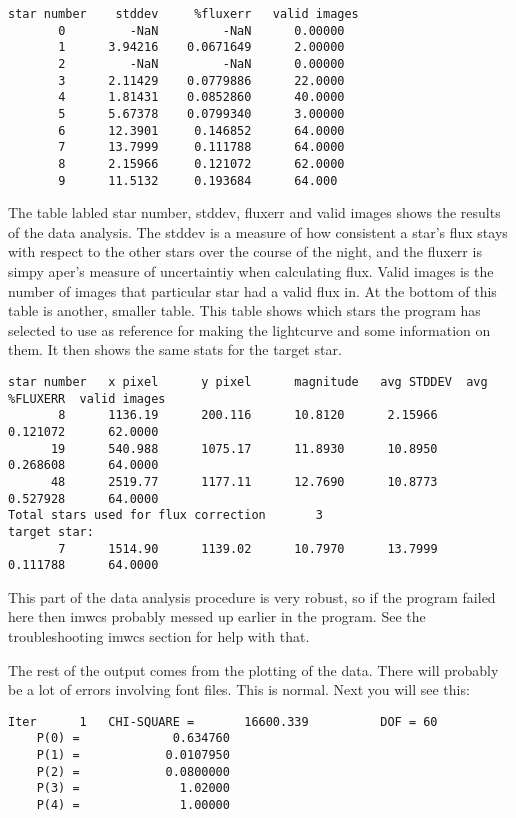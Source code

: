 \documentclass[10pt,preprint]{aastex}
\begin{document}
\begin{verbatim}
star number    stddev     %fluxerr   valid images
       0         -NaN         -NaN      0.00000
       1      3.94216    0.0671649      2.00000
       2         -NaN         -NaN      0.00000
       3      2.11429    0.0779886      22.0000
       4      1.81431    0.0852860      40.0000
       5      5.67378    0.0799340      3.00000
       6      12.3901     0.146852      64.0000
       7      13.7999     0.111788      64.0000
       8      2.15966     0.121072      62.0000
       9      11.5132     0.193684      64.000
\end{verbatim}

The table labled star number, stddev, fluxerr and valid images shows the results of the data analysis. The stddev is a measure of how consistent a star's flux stays with respect to the other stars over the course of the night, and the fluxerr is simpy aper's measure of uncertaintiy when calculating flux. Valid images is the number of images that particular star had a valid flux in. At the bottom of this table is another, smaller table. This table shows which stars the program has selected to use as reference for making the lightcurve and some information on them.  It then shows the same stats for the target star.

\begin{verbatim}
star number   x pixel      y pixel      magnitude   avg STDDEV  avg %FLUXERR  valid images
       8      1136.19      200.116      10.8120      2.15966     0.121072      62.0000
      19      540.988      1075.17      11.8930      10.8950     0.268608      64.0000
      48      2519.77      1177.11      12.7690      10.8773     0.527928      64.0000
Total stars used for flux correction       3
target star:
       7      1514.90      1139.02      10.7970      13.7999     0.111788      64.0000

\end{verbatim}

This part of the data analysis procedure is very robust, so if the program failed here then imwcs probably messed up earlier in the program. See the troubleshooting imwcs section for help with that.

The rest of the output comes from the plotting of the data. There will probably be a lot of errors involving font files. This is normal. Next you will see this: 

\begin{verbatim}
Iter      1   CHI-SQUARE =       16600.339          DOF = 60
    P(0) =             0.634760
    P(1) =            0.0107950
    P(2) =            0.0800000
    P(3) =              1.02000
    P(4) =              1.00000
\end{verbatim}
\end{document}
